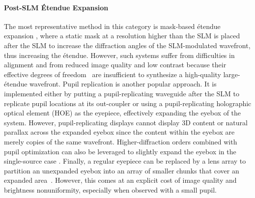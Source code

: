 \paragraph{\bf{Post-SLM \'Etendue Expansion}}
The most representative method in this category is mask-based \'etendue expansion \cite{kuo2020mask, tseng2023neural, park2019photon, yu2017speckle, buckley2006mask, monin2022mask}, where a static mask at a resolution higher than the SLM is placed after the SLM to increase the diffraction angles of the SLM-modulated wavefront, thus increasing the \'etendue. However, such systems suffer from difficulties in alignment and from reduced image quality and low contrast because their effective degrees of freedom~\cite{starikov1982effective} are insufficient to synthesize a high-quality large-\'etendue wavefront. Pupil replication \cite{bigler2018expansion, bigler2019expansion, draper2019expansion, draper2021dof, draper2022expansion, jang2024waveguide, Park2018-ge,kress2020waveguide} is another popular approach. It is implemented either by putting a pupil-replicating waveguide after the SLM to replicate pupil locations at its out-coupler or using a pupil-replicating holographic optical element (HOE) as the eyepiece, effectively expanding the eyebox of the system. However, pupil-replicating displays cannot display 3D content or natural parallax across the expanded eyebox since the content within the eyebox are merely copies of the same wavefront. Higher-diffraction orders combined with pupil optimization can also be leveraged to slightly expand the eyebox in the single-source case \cite{shi2024ergo,schiffers2023stochastic}. Finally, a regular eyepiece can be replaced by a lens array to partition an unexpanded eyebox into an array of smaller chunks that cover an expanded area~\cite{Chae2023-ll, Wang2023-vf, Xia2020-sa}. However, this comes at an explicit cost of image quality and brightness nonuniformity, especially when observed with a small pupil.

